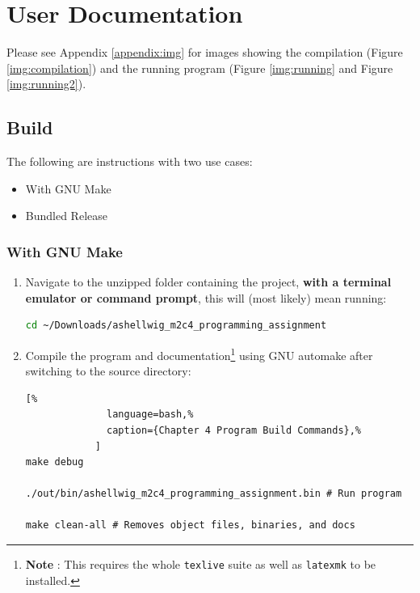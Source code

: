 \documentclass[a4paper, 11pt]{article}
\begin{document}
  \section{User Documentation}
    Please see Appendix \ref{appendix:img} for images showing the compilation
      (Figure \ref{img:compilation}) and the running program (Figure
      \ref{img:running} and Figure \ref{img:running2}).

    \subsection{Build}
      The following are instructions with two use cases:
      \begin{itemize}
        \item With GNU Make
        \item Bundled Release
      \end{itemize}
      \subsubsection{With GNU Make}
        \begin{enumerate}
          \item Navigate to the unzipped folder containing the project,
            \textbf{with a terminal emulator or command prompt}, this will
            (most likely) mean running:
            \begin{lstlisting}[language=bash]
cd ~/Downloads/ashellwig_m2c4_programming_assignment
            \end{lstlisting}
          \item Compile the program and documentation\footnote{\textbf{Note%
            }: This requires the whole \texttt{texlive} suite as well as
            \texttt{latexmk} to be installed.} using GNU automake after
            switching to the source directory:
            \begin{lstlisting}[%
              language=bash,%
              caption={Chapter 4 Program Build Commands},%
            ]
make debug

./out/bin/ashellwig_m2c4_programming_assignment.bin # Run program

make clean-all # Removes object files, binaries, and docs
            \end{lstlisting}
          \end{enumerate}
\end{document}
